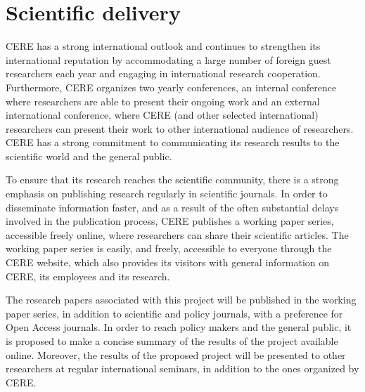 \section{Scientific delivery}
CERE has a strong international outlook and continues to strengthen its international reputation by accommodating a large number of foreign guest researchers each year and engaging in international research cooperation. Furthermore, CERE organizes two yearly conferences, an internal conference where researchers are able to present their ongoing work and an external international conference, where CERE (and other selected international) researchers can present their work to other international audience of researchers. CERE has a strong commitment to communicating its research results to the scientific world and the general public.

To ensure that its research reaches the scientific community, there is a strong emphasis on publishing research regularly in scientific journals. In order to disseminate information faster, and as a result of the often substantial delays involved in the publication process, CERE publishes a working paper series, accessible freely online, where researchers can share their scientific articles. The working paper series is easily, and freely, accessible to everyone through the CERE website, which also provides its visitors with general information on CERE, its employees and its research.

The research papers associated with this project will be published in the working paper series, in addition to scientific and policy journals, with a preference for Open Access journals. In order to reach policy makers and the general public, it is proposed to make a concise summary of the results of the project available online. Moreover, the results of the proposed project will be presented to other researchers at regular international seminars, in addition to the ones organized by CERE.


